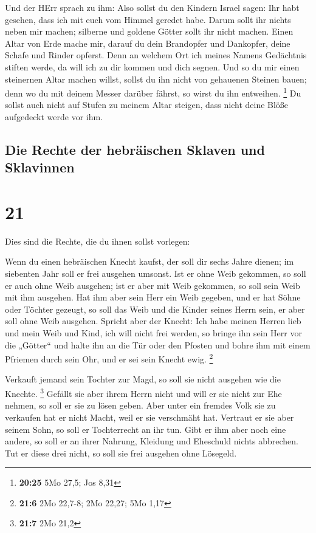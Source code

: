  Und der HErr sprach zu ihm: Also sollst du den Kindern
Israel sagen: Ihr habt gesehen, dass ich mit euch vom Himmel geredet
habe.  Darum sollt ihr nichts neben mir machen; silberne
und goldene Götter sollt ihr nicht machen.  Einen Altar
von Erde mache mir, darauf du dein Brandopfer und Dankopfer, deine
Schafe und Rinder opferst. Denn an welchem Ort ich meines Namens
Gedächtnis stiften werde, da will ich zu dir kommen und dich segnen.
 Und so du mir einen steinernen Altar machen willst,
sollst du ihn nicht von gehauenen Steinen bauen; denn wo du mit deinem
Messer darüber fährst, so wirst du ihn entweihen. \footnote{\textbf{20:25}
  5Mo 27,5; Jos 8,31}  Du sollst auch nicht auf Stufen zu
meinem Altar steigen, dass nicht deine Blöße aufgedeckt werde vor ihm.

\hypertarget{die-rechte-der-hebruxe4ischen-sklaven-und-sklavinnen}{%
\subsection{Die Rechte der hebräischen Sklaven und
Sklavinnen}\label{die-rechte-der-hebruxe4ischen-sklaven-und-sklavinnen}}

\hypertarget{section-20}{%
\section{21}\label{section-20}}

 Dies sind die Rechte, die du ihnen sollst vorlegen:

 Wenn du einen hebräischen Knecht kaufst, der soll dir
sechs Jahre dienen; im siebenten Jahr soll er frei ausgehen umsonst.
 Ist er ohne Weib gekommen, so soll er auch ohne Weib
ausgehen; ist er aber mit Weib gekommen, so soll sein Weib mit ihm
ausgehen.  Hat ihm aber sein Herr ein Weib gegeben, und er
hat Söhne oder Töchter gezeugt, so soll das Weib und die Kinder seines
Herrn sein, er aber soll ohne Weib ausgehen.  Spricht aber
der Knecht: Ich habe meinen Herren lieb und mein Weib und Kind, ich will
nicht frei werden,  so bringe ihn sein Herr vor die
„Götter`` und halte ihn an die Tür oder den Pfosten und bohre ihm mit
einem Pfriemen durch sein Ohr, und er sei sein Knecht ewig. \footnote{\textbf{21:6}
  2Mo 22,7-8; 2Mo 22,27; 5Mo 1,17}

 Verkauft jemand sein Tochter zur Magd, so soll sie nicht
ausgehen wie die Knechte. \footnote{\textbf{21:7} 2Mo 21,2}
 Gefällt sie aber ihrem Herrn nicht und will er sie nicht
zur Ehe nehmen, so soll er sie zu lösen geben. Aber unter ein fremdes
Volk sie zu verkaufen hat er nicht Macht, weil er sie verschmäht hat.
 Vertraut er sie aber seinem Sohn, so soll er Tochterrecht
an ihr tun.  Gibt er ihm aber noch eine andere, so soll
er an ihrer Nahrung, Kleidung und Eheschuld nichts abbrechen.
 Tut er diese drei nicht, so soll sie frei ausgehen ohne
Lösegeld.

